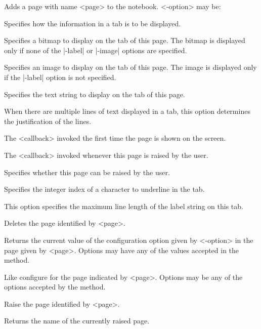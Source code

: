 \begin{enum}{1cm}

Adds a page with name <page> to the notebook.  <-option> may be:

Specifies how the information in a tab is to be displayed.

Specifies a bitmap to display on the tab of this page. The bitmap is displayed only if none of the |-label| or
|-image| options are specified. 

Specifies an image to display on the tab of this page. The image is displayed only if the |-label| option is not
specified. 

Specifies the text string to display on the tab of this page. 

When there are multiple lines of text displayed in a tab, this option determines the justification of the lines.

The <callback> invoked the first time the page is shown on the screen.

The <callback> invoked whenever this page is raised by the user. 

Specifies whether this page can be raised by the user.

Specifies the integer index of a character to underline in the tab.

This option specifies the maximum line length of the label string on this tab.

Deletes the page identified by <page>. 

Returns the current value of the configuration option given by <-option> in the page given by <page>. Options may
have any of the values accepted in the  method. 

Like configure for the page indicated by <page>. Options may be any of the options accepted by the
  method. 

Raise the page identified by <page>. 

Returns the name of the currently raised page. 

\end{enum}

